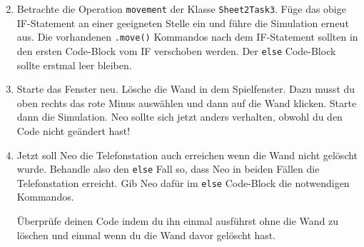 \begin{enumerate} \setcounter{enumi}{1}
    \item Betrachte die Operation \lstinline{movement} der Klasse \lstinline{Sheet2Task3}. 
        Füge das obige IF-Statement an einer geeigneten Stelle ein und führe die Simulation erneut aus.
        Die vorhandenen \lstinline{.move()} Kommandos nach dem IF-Statement sollten in den ersten Code-Block vom IF verschoben werden.
        Der \lstinline{else} Code-Block sollte erstmal leer bleiben.
    \item Starte das Fenster neu.
        Lösche die Wand in dem Spielfenster.
        Dazu musst du oben rechts das rote Minus auswählen und dann auf die Wand klicken.
        Starte dann die Simulation.
        Neo sollte sich jetzt anders verhalten, obwohl du den Code nicht geändert hast!
    \item Jetzt soll Neo die Telefonstation auch erreichen wenn die Wand nicht gelöscht wurde.
        Behandle also den \lstinline{else} Fall so, dass Neo in beiden Fällen die Telefonstation erreicht.
        Gib Neo dafür im \lstinline{else} Code-Block die notwendigen Kommandos.

        Überprüfe deinen Code indem du ihn einmal ausführst ohne die Wand zu löschen und einmal wenn du die Wand davor gelöscht hast.

\end{enumerate}

